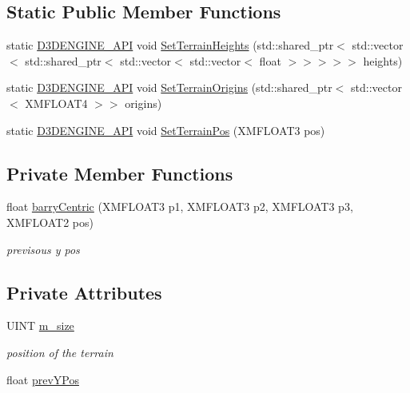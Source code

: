 \subsection*{Static Public Member Functions}
\begin{DoxyCompactItemize}
\item 
static \mbox{\hyperlink{stdafx_8h_a8ee2d990c5dfba7794dd2b60741d7722}{D3\+D\+E\+N\+G\+I\+N\+E\+\_\+\+A\+PI}} void \mbox{\hyperlink{class_terrain_collision_helper_a20aabd831788e8953b580ebf263b156c}{Set\+Terrain\+Heights}} (std\+::shared\+\_\+ptr$<$ std\+::vector$<$ std\+::shared\+\_\+ptr$<$ std\+::vector$<$ std\+::vector$<$ float $>$$>$$>$$>$$>$ heights)
\item 
static \mbox{\hyperlink{stdafx_8h_a8ee2d990c5dfba7794dd2b60741d7722}{D3\+D\+E\+N\+G\+I\+N\+E\+\_\+\+A\+PI}} void \mbox{\hyperlink{class_terrain_collision_helper_aa2df0c6cbe00dd3ac6fb6e75f9532c82}{Set\+Terrain\+Origins}} (std\+::shared\+\_\+ptr$<$ std\+::vector$<$ X\+M\+F\+L\+O\+A\+T4 $>$$>$ origins)
\item 
static \mbox{\hyperlink{stdafx_8h_a8ee2d990c5dfba7794dd2b60741d7722}{D3\+D\+E\+N\+G\+I\+N\+E\+\_\+\+A\+PI}} void \mbox{\hyperlink{class_terrain_collision_helper_abebaf2ed1b6534d1f6b1a42eb6e7ab6f}{Set\+Terrain\+Pos}} (X\+M\+F\+L\+O\+A\+T3 pos)
\end{DoxyCompactItemize}
\subsection*{Private Member Functions}
\begin{DoxyCompactItemize}
\item 
float \mbox{\hyperlink{class_terrain_collision_helper_aacd402e6c1598bda975a51883bbd409a}{barry\+Centric}} (X\+M\+F\+L\+O\+A\+T3 p1, X\+M\+F\+L\+O\+A\+T3 p2, X\+M\+F\+L\+O\+A\+T3 p3, X\+M\+F\+L\+O\+A\+T2 pos)
\begin{DoxyCompactList}\small\item\em previsous y pos \end{DoxyCompactList}\end{DoxyCompactItemize}
\subsection*{Private Attributes}
\begin{DoxyCompactItemize}
\item 
U\+I\+NT \mbox{\hyperlink{class_terrain_collision_helper_af9623630d3c1c2848b80aa3ccbb249ce}{m\+\_\+size}}
\begin{DoxyCompactList}\small\item\em position of the terrain \end{DoxyCompactList}\item 
float \mbox{\hyperlink{class_terrain_collision_helper_a3418ac5abfc56f291e2ca54a8661513a}{prev\+Y\+Pos}}
\end{DoxyCompactItemize}
